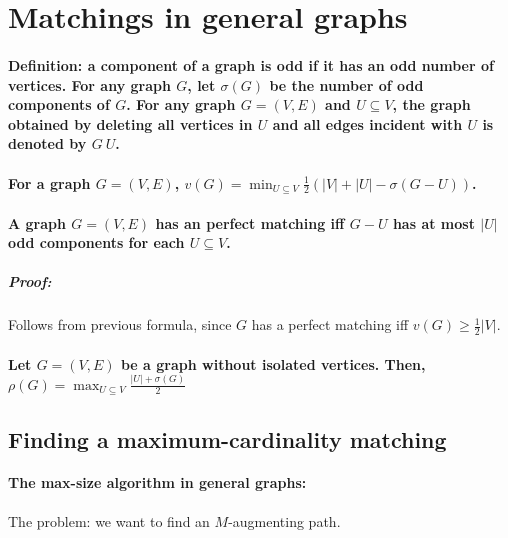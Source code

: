 \documentclass[main]{subfiles}
\begin{document}

\section{Matchings in general graphs}

\paragraph{Definition: a component of a graph is odd if it has an odd number of
vertices. For any graph $G$, let $\sigma(G)$ be the number of odd components of
$G$. For any graph $G=(V,E)$ and $U \subseteq V$, the graph obtained by
deleting all vertices in $U$ and all edges incident with $U$ is denoted by
$G \ U$.}

\paragraph{For a graph $G=(V,E)$, $v(G) = \displaystyle \min_{U \subseteq V}
\frac{1}{2}(|V| + |U| - \sigma(G - U))$.}

\paragraph{A graph $G=(V,E)$ has an perfect matching iff $G - U$ has at most
$|U|$ odd components for each $U \subseteq V$.}
\subparagraph{Proof:} Follows from previous formula, since $G$ has a perfect
matching iff $v(G) \geq \frac{1}{2} |V|$.

\paragraph{Let $G=(V,E)$ be a graph without isolated vertices. Then, $\rho(G) =
\displaystyle \max_{U \subseteq V} \frac{|U| + \sigma(G)}{2}$}

\subsection{Finding a maximum-cardinality matching}

\paragraph{The max-size algorithm in general graphs:}
The problem: we want to find an $M$-augmenting path.
\end{document}
